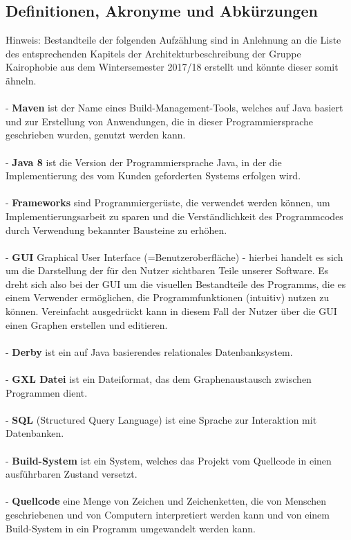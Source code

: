 \documentclass[enabledeprecatedfontcommands,fontsize=11pt,paper=a4,twoside]{scrartcl}
\newcounter{one}
\begin{document}
\subsection{Definitionen, Akronyme und Abkürzungen}
Hinweis: Bestandteile der folgenden Aufzählung sind in Anlehnung an die Liste des entsprechenden Kapitels der Architekturbeschreibung der Gruppe Kairophobie aus dem Wintersemester 2017/18 erstellt und könnte dieser somit ähneln. \\ \\
- \textbf{Maven} ist der Name eines Build-Management-Tools, welches auf Java basiert und zur Erstellung von Anwendungen, die in dieser Programmiersprache geschrieben wurden, genutzt werden kann. \\ \\
- \textbf{Java 8} ist die Version der Programmiersprache Java, in der die Implementierung des vom Kunden geforderten Systems erfolgen wird. \\ \\
- \textbf{Frameworks} sind Programmiergerüste, die verwendet werden können, um Implementierungsarbeit zu sparen und die Verständlichkeit des Programmcodes durch Verwendung bekannter Bausteine zu erhöhen. \\ \\
- \textbf{GUI} Graphical User Interface (=Benutzeroberfläche) - hierbei handelt es sich um die Darstellung der für den Nutzer sichtbaren Teile unserer Software. Es dreht sich also bei der GUI um die visuellen Bestandteile des Programms, die es einem Verwender ermöglichen, die Programmfunktionen (intuitiv) nutzen zu können. Vereinfacht ausgedrückt kann in diesem Fall der Nutzer über die GUI einen Graphen erstellen und editieren. \\ \\
- \textbf{Derby} ist ein auf Java basierendes relationales Datenbanksystem. \\ \\
- \textbf{GXL Datei} ist ein Dateiformat, das dem Graphenaustausch zwischen Programmen dient. \\ \\
- \textbf{SQL} (Structured Query Language) ist eine Sprache zur Interaktion mit Datenbanken. \\ \\
- \textbf{Build-System} ist ein System, welches das Projekt vom Quellcode in einen ausführbaren Zustand versetzt. \\ \\
- \textbf{Quellcode} eine Menge von Zeichen und Zeichenketten, die von Menschen geschriebenen und von Computern interpretiert werden kann und von einem Build-System in ein Programm umgewandelt werden kann.  \\ \\
\end{document}
